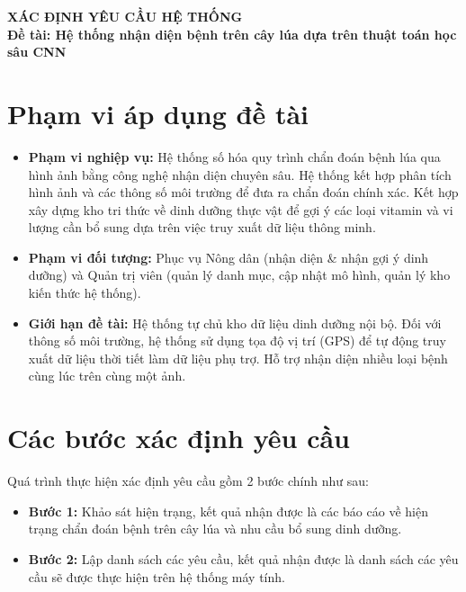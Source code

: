 \documentclass[12pt,a4paper]{article}
\begin{document}
\begin{center}
    \Large\textbf{XÁC ĐỊNH YÊU CẦU HỆ THỐNG} \\
    \vspace{0.2cm}
    \large\textbf{Đề tài: Hệ thống nhận diện bệnh trên cây lúa dựa trên thuật toán học sâu CNN}
\end{center}

\section*{Phạm vi áp dụng đề tài}
\begin{itemize}
    \item \textbf{Phạm vi nghiệp vụ:} Hệ thống số hóa quy trình chẩn đoán bệnh lúa qua hình ảnh bằng công nghệ nhận diện chuyên sâu. Hệ thống kết hợp phân tích hình ảnh và các thông số môi trường để đưa ra chẩn đoán chính xác. Kết hợp xây dựng kho tri thức về dinh dưỡng thực vật để gợi ý các loại vitamin và vi lượng cần bổ sung dựa trên việc truy xuất dữ liệu thông minh.
    \item \textbf{Phạm vi đối tượng:} Phục vụ Nông dân (nhận diện \& nhận gợi ý dinh dưỡng) và Quản trị viên (quản lý danh mục, cập nhật mô hình, quản lý kho kiến thức hệ thống).
    \item \textbf{Giới hạn đề tài:} Hệ thống tự chủ kho dữ liệu dinh dưỡng nội bộ. Đối với thông số môi trường, hệ thống sử dụng tọa độ vị trí (GPS) để tự động truy xuất dữ liệu thời tiết làm dữ liệu phụ trợ. Hỗ trợ nhận diện nhiều loại bệnh cùng lúc trên cùng một ảnh.
\end{itemize}

\section*{Các bước xác định yêu cầu}

Quá trình thực hiện xác định yêu cầu gồm 2 bước chính như sau:
\begin{itemize}
    \item \textbf{Bước 1:} Khảo sát hiện trạng, kết quả nhận được là các báo cáo về hiện trạng chẩn đoán bệnh trên cây lúa và nhu cầu bổ sung dinh dưỡng.
    \item \textbf{Bước 2:} Lập danh sách các yêu cầu, kết quả nhận được là danh sách các yêu cầu sẽ được thực hiện trên hệ thống máy tính.
\end{itemize}
\end{document}

